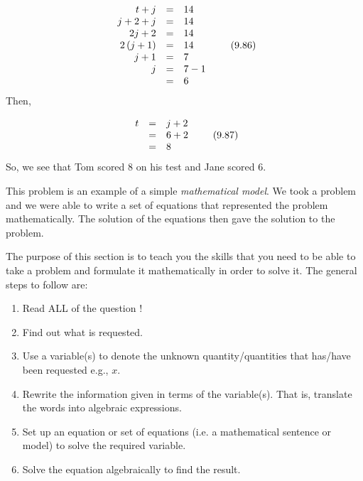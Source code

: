     \begin{equation}
    \begin{array}{ccc}\hfill t+j& =& 14\hfill \\ \hfill j+2+j& =& 14\hfill \\ \hfill 2j+2& =& 14\hfill \\ \hfill 2\left(j+1\right)& =& 14\hfill \\ \hfill j+1& =& 7\hfill \\ \hfill j& =& 7-1\hfill \\ & =& 6\hfill \end{array}\tag{9.86}
      \end{equation}
        \label{m39262*id161806}Then,\par 
        \label{m39262*id161812}\nopagebreak\noindent{}
          
    \begin{equation}
    \begin{array}{ccc}\hfill t& =& j+2\hfill \\ & =& 6+2\hfill \\ & =& 8\hfill \end{array}\tag{9.87}
      \end{equation}
        \label{m39262*id161871}So, we see that Tom scored 8 on his test and Jane scored 6.\par 
        \label{m39262*id161878}This problem is an example of a simple \textsl{mathematical model}. We took a problem and we were able to write a set of equations that represented the problem mathematically. The solution of the equations then gave the solution to the problem.\par 
      \label{m39262*uid103}
            \nopagebreak
        \label{m39262*id161898}The purpose of this section is to teach you the skills that you need to be able to take a problem and formulate it mathematically in order to solve it. The general steps to follow are:\par 
        \label{m39262*id161903}\begin{enumerate}[noitemsep, label=\textbf{\arabic*}. ] 
            \label{m39262*uid104}\item Read ALL of the question !
\label{m39262*uid105}\item Find out what is requested.
\label{m39262*uid106}\item Use a variable(s) to denote the unknown quantity/quantities that has/have been requested e.g., $x$.
\label{m39262*uid107}\item Rewrite the information given in terms of the variable(s). That is, translate the words into algebraic expressions. 
\label{m39262*uid108}\item Set up an equation or set of equations (i.e. a mathematical sentence or model) to solve the required variable.
\label{m39262*uid109}\item Solve the equation algebraically to find the result.
\end{enumerate}

